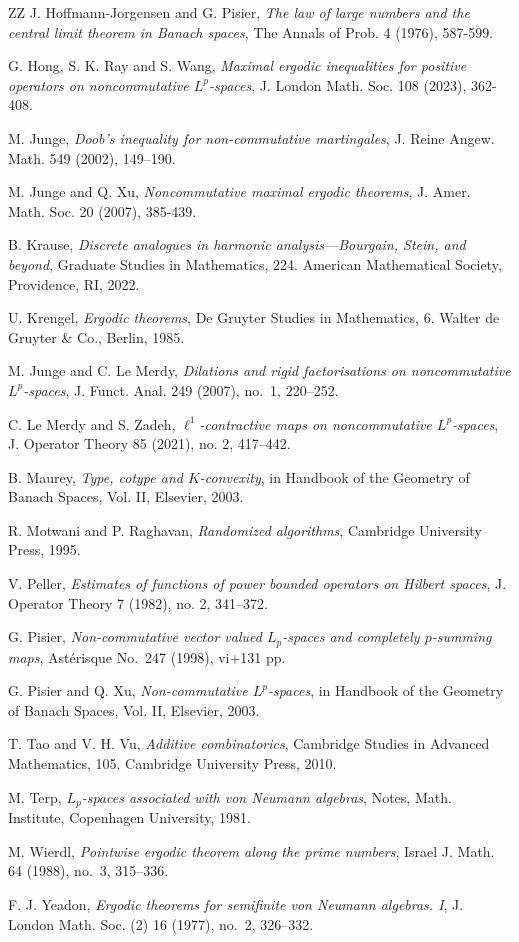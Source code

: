 \documentclass[12pt]{amsart}
\theoremstyle{remark}
\theoremstyle{definition}
\numberwithin{equation}{section}
\begin{document}
\begin{thebibliography}{ZZ}
 J. Hoffmann-Jorgensen and G. Pisier, {\it The law of large numbers and the 
central limit theorem in Banach spaces}, The Annals of Prob. 4 (1976), 587-599.

 G. Hong, S. K. Ray and S. Wang, 
{\it Maximal ergodic inequalities for positive operators on noncommutative $L^p$-spaces}, J. London Math. Soc. 108 (2023), 362-408.

 M. Junge, {\it Doob's inequality for non-commutative martingales},
J. Reine Angew. Math. 549 (2002), 149–190.

 M. Junge and Q. Xu, {\it Noncommutative maximal ergodic theorems}, 
J. Amer. Math. Soc. 20 (2007), 385-439. 

 B. Krause,
{\it Discrete analogues in harmonic analysis—Bourgain, Stein, and beyond},
Graduate Studies in Mathematics, 224. American Mathematical Society, Providence, RI, 2022.

 U. Krengel,
{\it Ergodic theorems},
De Gruyter Studies in Mathematics, 6. Walter de Gruyter \& Co., Berlin, 1985. 

 M. Junge and C. Le Merdy,
{\it Dilations and rigid factorisations on noncommutative $L^p$-spaces},
J. Funct. Anal. 249 (2007), no.~1, 220--252.

 C. Le Merdy and S. Zadeh, {\it $\ell^1$-contractive maps on noncommutative $L^p$-spaces}, 
J. Operator Theory 85 (2021), no. 2, 417–442. 

 B. Maurey, {\it Type, cotype and $K$-convexity},  
in Handbook of the Geometry of Banach Spaces, Vol. II, Elsevier, 2003.

 R. Motwani and P. Raghavan, {\it Randomized algorithms}, Cambridge University Press, 1995. 

 V. Peller, {\it Estimates of functions of power bounded operators on Hilbert spaces},
J. Operator Theory 7 (1982), no. 2, 341–372.

 G. Pisier,
{\it Non-commutative vector valued $L_p$-spaces and completely $p$-summing maps},
Astérisque No.~247 (1998), vi+131 pp.

 G. Pisier and Q. Xu, {\it Non-commutative $L^p$-spaces},
in Handbook of the Geometry of Banach Spaces, Vol. II, Elsevier, 2003.

 T. Tao and V. H. Vu, {\it Additive combinatorics}, Cambridge Studies in Advanced Mathematics, 105. Cambridge University Press, 2010. 

 M. Terp, {\it $L_p$-spaces associated with von Neumann algebras}, Notes, Math. Institute, Copenhagen University, 1981.

 M. Wierdl,
{\it Pointwise ergodic theorem along the prime numbers},
Israel J. Math. 64 (1988), no.~3, 315--336.

 F. J. Yeadon,
{\it Ergodic theorems for semifinite von Neumann algebras. I},
J. London Math. Soc. (2) 16 (1977), no.~2, 326--332.

\end{thebibliography}
 \bigskip   
\end{document}
